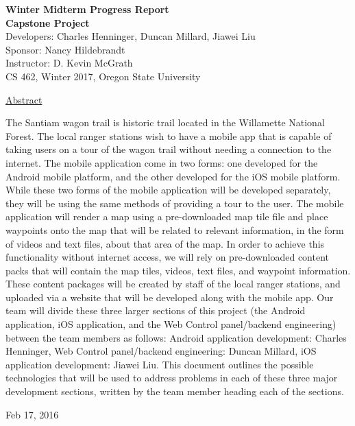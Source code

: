 \documentclass[letterpaper, 10pt,titlepage]{article}
\newcommand\tab[1][1cm]{\hspace*{#1}}
\begin{document}
\begin{titlepage}
\begin{center}
    \Huge
    \textbf{Winter Midterm Progress Report}\\
    \textbf{Capstone Project}\\
    \vspace{1.0cm}
    \large
    Developers: Charles Henninger, Duncan Millard, Jiawei Liu\\
    Sponsor: Nancy Hildebrandt\\
    \vspace{1.5cm}
    \large
    Instructor: D. Kevin McGrath\\

    \large
    CS 462, Winter 2017, Oregon State University\\    

    \vspace{3.2cm}

    \large
    \underline{Abstract}\\
    \vspace{0.3cm}
    \end{center}
    \large

    \tab The Santiam wagon trail is historic trail located in the Willamette National Forest. The local ranger stations wish to have a mobile app that is capable of taking users on a tour of the wagon trail without needing a connection to the internet. The mobile application come in two forms: one developed for the Android mobile platform, and the other developed for the iOS mobile platform. While these two forms of the mobile application will be developed separately, they will be using the same methods of providing a tour to the user. The mobile application will render a map using a pre-downloaded map tile file and place waypoints onto the map that will be related to relevant information, in the form of videos and text files, about that area of the map. In order to achieve this functionality without internet access, we will rely on pre-downloaded content packs that will contain the map tiles, videos, text files, and waypoint information. These content packages will be created by staff of the local ranger stations, and uploaded via a website that will be developed along with the mobile app. Our team will divide these three larger sections of this project (the Android application, iOS application, and the Web Control panel/backend engineering) between the team members as follows: Android application development: Charles Henninger, Web Control panel/backend engineering: Duncan Millard, iOS application development: Jiawei Liu. This document outlines the possible technologies that will be used to address problems in each of these three major development sections, written by the team member heading each of the sections.
    
    \vspace{0.8cm}
    \vfill
    
\begin{center}    
    Feb 17, 2016

\end{center}
\end{titlepage}
\end{document}
